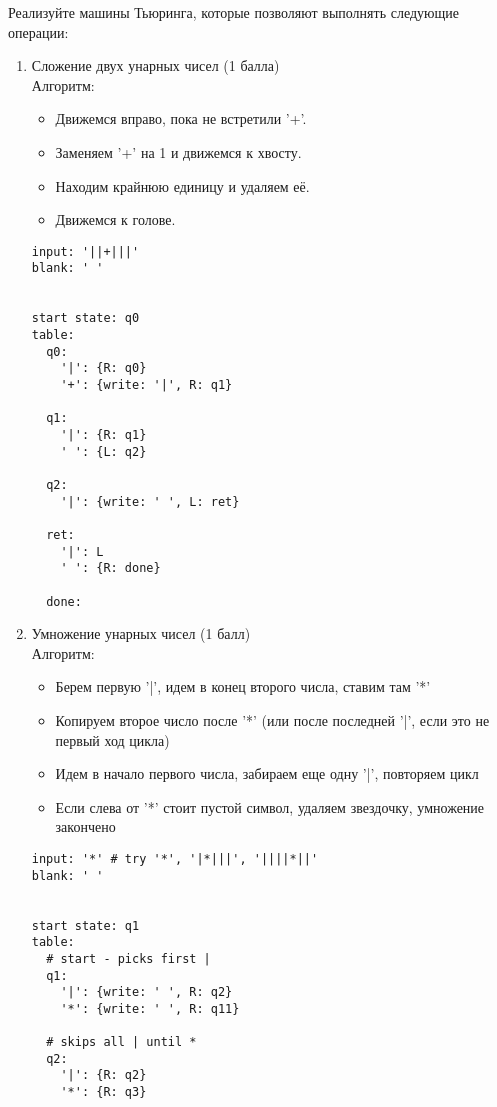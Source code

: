 \documentclass[a4paper]{article}
\begin{document}
Реализуйте машины Тьюринга, которые позволяют выполнять следующие операции:
\begin{enumerate}
    \item Сложение двух унарных чисел (1 балла) \\
		Алгоритм:
        \begin{itemize}
            \item Движемся вправо, пока не встретили '+'.
            \item Заменяем '+' на 1 и движемся к хвосту.
            \item Находим крайнюю единицу и удаляем её.
            \item Движемся к голове.
        \end{itemize}
		
\begin{verbatim}
input: '||+|||' 
blank: ' '


start state: q0
table:
  q0: 
    '|': {R: q0}
    '+': {write: '|', R: q1}
  
  q1:
    '|': {R: q1}
    ' ': {L: q2}
  
  q2:
    '|': {write: ' ', L: ret}
  
  ret:
    '|': L
    ' ': {R: done}
  
  done:        
\end{verbatim}

    \item Умножение унарных чисел (1 балл) \\
		Алгоритм: \\
		\begin{itemize}
			\item Берем первую '|', идем в конец второго числа, ставим там '*'
			\item Копируем второе число после '*' (или после последней '|', если это не первый ход цикла)
			\item Идем в начало первого числа, забираем еще одну '|', повторяем цикл
			\item Если слева от '*' стоит пустой символ, удаляем звездочку, умножение закончено
		\end{itemize}
		\begin{verbatim}
input: '*' # try '*', '|*|||', '||||*||'
blank: ' '


start state: q1
table:
  # start - picks first |
  q1:
    '|': {write: ' ', R: q2}
    '*': {write: ' ', R: q11}
    
  # skips all | until *
  q2:
    '|': {R: q2}
    '*': {R: q3}
    

\end{verbatim}
\end{enumerate}
\end{document}
